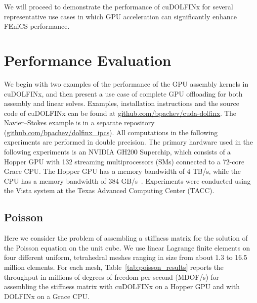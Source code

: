 We will proceed to demonstrate the performance of cuDOLFINx for several representative use cases in which GPU acceleration can significantly enhance FEniCS performance.

\section*{Performance Evaluation}
We begin with two examples of the performance of the GPU assembly kernels in cuDOLFINx, and then present a use case of complete GPU offloading for both assembly and linear solves. Examples, installation instructions and the source code of cuDOLFINx can be found at \href{https://github.com/bpachev/cuda-dolfinx}{github.com/bpachev/cuda-dolfinx}. The Navier--Stokes example is in a separate repository (\href{https://github.com/bpachev/dolfinx\_ipcs}{github.com/bpachev/dolfinx\_ipcs}). All computations in the following experiments are performed in double precision. The primary hardware used in the following experiments is an NVIDIA GH200 Superchip, which consists of a Hopper GPU with 132 streaming multiprocessors (SMs) connected to a 72-core Grace CPU. The Hopper GPU has a memory bandwidth of 4 TB/s, while the CPU has a memory bandwidth of 384 GB/s~\citep{gh200specs}. Experiments were conducted using the Vista system at the Texas Advanced Computing Center (TACC).

\subsection*{Poisson}
%
Here we consider the problem of assembling a stiffness matrix for the solution of the Poisson equation on the unit cube. We use linear Lagrange finite elements on four different uniform, tetrahedral meshes ranging in size from about 1.3 to 16.5 million elements.  For each mesh, Table~\ref{tab:poisson_results} reports the throughput in millions of degrees of freedom per second (MDOF/s) for assembling the stiffness matrix with cuDOLFINx on a Hopper GPU and with DOLFINx on a Grace CPU.

